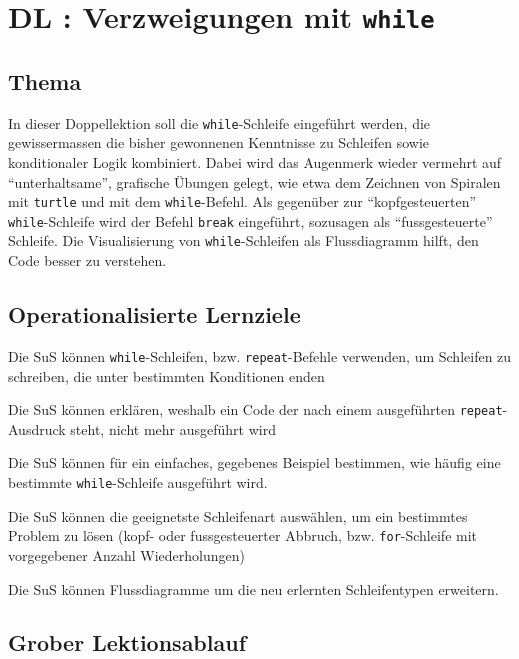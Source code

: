 \section{DL \themycounter: Verzweigungen mit \texorpdfstring{\lstinline|while|}{while}}
\begin{myExBox}[title=DL \themycounter]
\subsection*{Thema}
In dieser Doppellektion soll die \lstinline|while|-Schleife eingeführt werden, die gewissermassen die bisher gewonnenen Kenntnisse zu Schleifen sowie konditionaler Logik kombiniert. Dabei wird das Augenmerk wieder vermehrt auf ``unterhaltsame'', grafische Übungen gelegt, wie etwa dem Zeichnen von Spiralen mit \lstinline|turtle| und mit dem \lstinline|while|-Befehl. Als gegenüber zur ``kopfgesteuerten'' \lstinline|while|-Schleife wird der Befehl \lstinline|break| eingeführt, sozusagen als ``fussgesteuerte'' Schleife. Die Visualisierung von \lstinline|while|-Schleifen als Flussdiagramm hilft, den Code besser zu verstehen.

\subsection*{Operationalisierte Lernziele}
\begin{todolist}
    \item Die SuS können \lstinline|while|-Schleifen, bzw. \lstinline|repeat|-Befehle verwenden, um Schleifen zu schreiben, die unter bestimmten Konditionen enden
    \item Die SuS können erklären, weshalb ein Code der nach einem ausgeführten \lstinline|repeat|-Ausdruck steht, nicht mehr ausgeführt wird
    \item Die SuS können für ein einfaches, gegebenes Beispiel bestimmen, wie häufig eine bestimmte \lstinline|while|-Schleife ausgeführt wird.
    \item Die SuS können die geeignetste Schleifenart auswählen, um ein bestimmtes Problem zu lösen (kopf- oder fussgesteuerter Abbruch, bzw. \lstinline|for|-Schleife mit vorgegebener Anzahl Wiederholungen)
    \item Die SuS können Flussdiagramme um die neu erlernten Schleifentypen erweitern.
\end{todolist}

\subsection*{Grober Lektionsablauf}


\end{myExBox}
